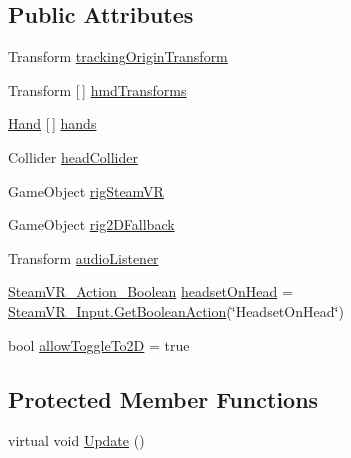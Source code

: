 \subsection*{Public Attributes}
\begin{DoxyCompactItemize}
\item 
Transform \mbox{\hyperlink{class_valve_1_1_v_r_1_1_interaction_system_1_1_player_a8bcf90ac5a364154517e0a0343e090a3}{tracking\+Origin\+Transform}}
\item 
Transform \mbox{[}$\,$\mbox{]} \mbox{\hyperlink{class_valve_1_1_v_r_1_1_interaction_system_1_1_player_ac298669d1664666a895c1821f11ed616}{hmd\+Transforms}}
\item 
\mbox{\hyperlink{class_valve_1_1_v_r_1_1_interaction_system_1_1_hand}{Hand}} \mbox{[}$\,$\mbox{]} \mbox{\hyperlink{class_valve_1_1_v_r_1_1_interaction_system_1_1_player_a0125279478cf643348b0b88d8d70139a}{hands}}
\item 
Collider \mbox{\hyperlink{class_valve_1_1_v_r_1_1_interaction_system_1_1_player_a6988bfc619a4d79e509811f7eae16576}{head\+Collider}}
\item 
Game\+Object \mbox{\hyperlink{class_valve_1_1_v_r_1_1_interaction_system_1_1_player_a185464fdf2e8086a7e54a1ba48acf1c2}{rig\+Steam\+VR}}
\item 
Game\+Object \mbox{\hyperlink{class_valve_1_1_v_r_1_1_interaction_system_1_1_player_a0ccdff9c189f236280107c95774f9fdd}{rig2\+D\+Fallback}}
\item 
Transform \mbox{\hyperlink{class_valve_1_1_v_r_1_1_interaction_system_1_1_player_a89d7628f78d5518066c8dea0063ed083}{audio\+Listener}}
\item 
\mbox{\hyperlink{class_valve_1_1_v_r_1_1_steam_v_r___action___boolean}{Steam\+V\+R\+\_\+\+Action\+\_\+\+Boolean}} \mbox{\hyperlink{class_valve_1_1_v_r_1_1_interaction_system_1_1_player_a22e6f26051cecb5311af29b25a55b54f}{headset\+On\+Head}} = \mbox{\hyperlink{class_valve_1_1_v_r_1_1_steam_v_r___input_a1442b5592282c75d7caeb91fe3509124}{Steam\+V\+R\+\_\+\+Input.\+Get\+Boolean\+Action}}(\char`\"{}Headset\+On\+Head\char`\"{})
\item 
bool \mbox{\hyperlink{class_valve_1_1_v_r_1_1_interaction_system_1_1_player_a116767125feabf5d82dd98ea4a14e3f7}{allow\+Toggle\+To2D}} = true
\end{DoxyCompactItemize}
\subsection*{Protected Member Functions}
\begin{DoxyCompactItemize}
\item 
virtual void \mbox{\hyperlink{class_valve_1_1_v_r_1_1_interaction_system_1_1_player_a9910e0f1d5dc06cb2022d0ae0385d1eb}{Update}} ()
\end{DoxyCompactItemize}
